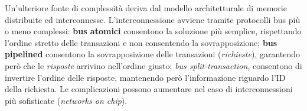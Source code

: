 \noindent Un'ulteriore fonte di complessità deriva dal modello architetturale di memorie distribuite ed interconnesse. L'interconnessione avviene tramite protocolli bus più o meno complessi: \textbf{bus atomici} consentono la soluzione più semplice, rispettando l'ordine stretto delle transazioni e non consentendo la sovrapposizione; \textbf{bus pipelined} consentono la sovrapposizione delle transazioni (\textit{richieste}), garantendo però che le \textit{risposte} arrivino nell'ordine giusto; \textit{bus split-transaction}, consentono di invertire l'ordine delle risposte, mantenendo però l'informazione riguardo l'ID della richiesta. Le complicazioni possono aumentare nel caso di interconnessioni più sofisticate (\textit{networks on chip}).
